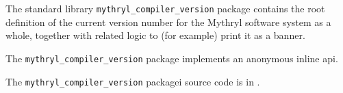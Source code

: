 
The standard library {\tt mythryl\_compiler\_version} package contains the 
root definition of the current version number for the Mythryl software system 
as a whole, together with related logic to (for example) print it as a banner.

The {\tt mythryl\_compiler\_version} package implements an anonymous inline api.

The {\tt mythryl\_compiler\_version} packagei source code is in .
